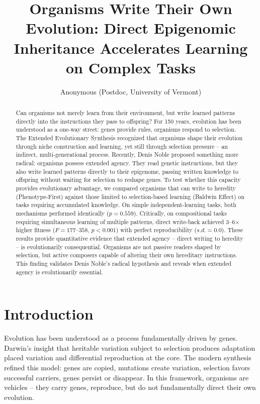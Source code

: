 \documentclass[twocolumn]{nature}
\title{Organisms Write Their Own Evolution: Direct Epigenomic Inheritance Accelerates Learning on Complex Tasks}
\author{Anonymous (Postdoc, University of Vermont)}
\date{}
\begin{document}
\maketitle

\begin{abstract}

Can organisms not merely learn from their environment, but write learned patterns directly into the instructions they pass to offspring? For 150 years, evolution has been understood as a one-way street: genes provide rules, organisms respond to selection. The Extended Evolutionary Synthesis recognized that organisms shape their evolution through niche construction and learning, yet still through selection pressure -- an indirect, multi-generational process. Recently, Denis Noble proposed something more radical: organisms possess extended agency. They read genetic instructions, but they also write learned patterns directly to their epigenome, passing written knowledge to offspring without waiting for selection to reshape genes. To test whether this capacity provides evolutionary advantage, we compared organisms that can write to heredity (Phenotype-First) against those limited to selection-based learning (Baldwin Effect) on tasks requiring accumulated knowledge. On simple independent-learning tasks, both mechanisms performed identically ($p = 0.559$). Critically, on compositional tasks requiring simultaneous learning of multiple patterns, direct write-back achieved 3--6$\times$ higher fitness ($F = 177$--$358$, $p < 0.001$) with perfect reproducibility ($s.d. = 0.0$). These results provide quantitative evidence that extended agency -- direct writing to heredity -- is evolutionarily consequential. Organisms are not passive readers shaped by selection, but active composers capable of altering their own hereditary instructions. This finding validates Denis Noble's radical hypothesis and reveals when extended agency is evolutionarily essential.

\end{abstract}


\section*{Introduction}

Evolution has been understood as a process fundamentally driven by genes. Darwin's insight that heritable variation subject to selection produces adaptation placed variation and differential reproduction at the core\cite{Darwin1859}. The modern synthesis refined this model: genes are copied, mutations create variation, selection favors successful carriers, genes persist or disappear\cite{Huxley1942}. In this framework, organisms are vehicles -- they carry genes, reproduce, but do not fundamentally direct their own evolution.
\end{document}
